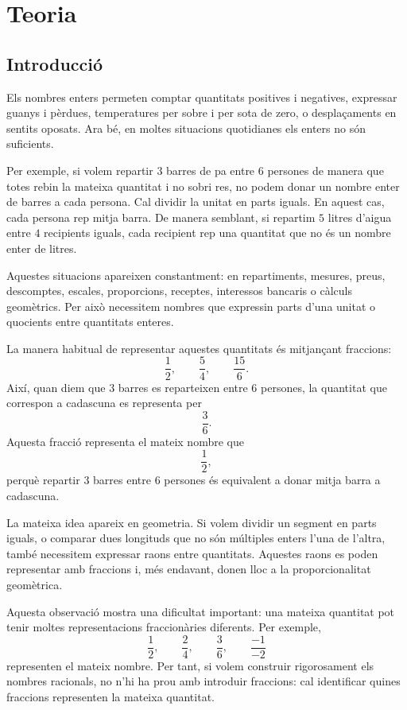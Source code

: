 \chapter{Teoria}
\label{cap:teoria}

\section{Introducció}

Els nombres enters permeten comptar quantitats positives i negatives, expressar guanys i pèrdues, temperatures per sobre i per sota de zero, o desplaçaments en sentits oposats. Ara bé, en moltes situacions quotidianes els enters no són suficients.

Per exemple, si volem repartir \(3\) barres de pa entre \(6\) persones de manera que totes rebin la mateixa quantitat i no sobri res, no podem donar un nombre enter de barres a cada persona. Cal dividir la unitat en parts iguals. En aquest cas, cada persona rep mitja barra. De manera semblant, si repartim \(5\) litres d'aigua entre \(4\) recipients iguals, cada recipient rep una quantitat que no és un nombre enter de litres.

Aquestes situacions apareixen constantment: en repartiments, mesures, preus, descomptes, escales, proporcions, receptes, interessos bancaris o càlculs geomètrics. Per això necessitem nombres que expressin parts d'una unitat o quocients entre quantitats enteres.

La manera habitual de representar aquestes quantitats és mitjançant fraccions:
\[
\frac{1}{2},\qquad
\frac{5}{4},\qquad
\frac{15}{6}.
\]
Així, quan diem que \(3\) barres es reparteixen entre \(6\) persones, la quantitat que correspon a cadascuna es representa per
\[
\frac{3}{6}.
\]
Aquesta fracció representa el mateix nombre que
\[
\frac{1}{2},
\]
perquè repartir \(3\) barres entre \(6\) persones és equivalent a donar mitja barra a cadascuna.

La mateixa idea apareix en geometria. Si volem dividir un segment en parts iguals, o comparar dues longituds que no són múltiples enters l'una de l'altra, també necessitem expressar raons entre quantitats. Aquestes raons es poden representar amb fraccions i, més endavant, donen lloc a la proporcionalitat geomètrica.

Aquesta observació mostra una dificultat important: una mateixa quantitat pot tenir moltes representacions fraccionàries diferents. Per exemple,
\[
\frac{1}{2},\qquad
\frac{2}{4},\qquad
\frac{3}{6},\qquad
\frac{-1}{-2}
\]
representen el mateix nombre. Per tant, si volem construir rigorosament els nombres racionals, no n'hi ha prou amb introduir fraccions: cal identificar quines fraccions representen la mateixa quantitat.

